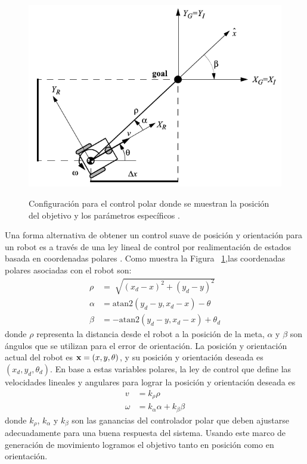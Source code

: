 \begin{figure}%
\centering \footnotesize
 {\includegraphics[width=0.60\linewidth]{images/control_polar.png}}
 \captionsetup{font=footnotesize}
 \caption{Configuraci\'on para el control polar donde se muestran la posici\'on del 
 objetivo y los par\'ametros espec\'ificos \cite{siegwart2011introduction}.}
\label{f:controlPolar}
\end{figure}

Una forma alternativa de obtener un control suave de posici\'on y orientaci\'on 
para un robot es a trav\'es de una ley lineal de control por realimentaci\'on 
de estados basada en coordenadas polares \cite{chwa2004sliding}. Como muestra la 
Figura ~\ref{f:controlPolar},las coordenadas polares asociadas con el robot son:
\begin{align*}
\rho &= \sqrt[]{(x_{d} - x)^2 + (y_{d} - y)^2} \\
\alpha &= \text{atan2}(y_{d} - y, x_{d} - x) - \theta \\
\beta &= -\text{atan2}(y_{d} - y, x_{d} - x) + \theta_{d}
\end{align*}
donde $\rho$ representa la distancia desde el robot a la posici\'on de la 
meta, $\alpha$ y $\beta$ son \'angulos que se utilizan para el error de 
orientaci\'on. La posición y orientación actual del robot es $\mathbf x=(x,y,\theta)$, y 
su posición y orientación deseada es $(x_{d},y_{d},\theta_{d})$. En base a estas 
variables polares, la ley de control que define las velocidades lineales y angulares 
para lograr la posición y orientación deseada es 
\begin{align}
\label{eqn:v}
v &= k_{\rho}\rho \\
\label{eqn:w}
\omega &= k_{\alpha}\alpha + k_{\beta}\beta
\end{align}
donde $k_{\rho}$, $k_{\alpha}$ y $k_{\beta}$ son las ganancias del controlador 
polar que deben ajustarse adecuadamente para una buena respuesta del sistema. Usando 
este marco de generaci\'on de movimiento logramos el objetivo tanto en posici\'on 
como en orientaci\'on.

